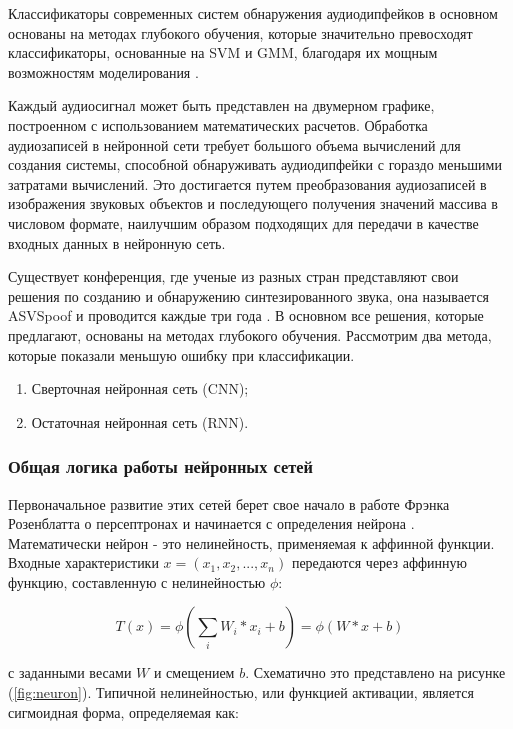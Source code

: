 Классификаторы современных систем обнаружения аудиодипфейков в основном основаны на методах глубокого обучения, которые значительно превосходят классификаторы, основанные на SVM и GMM, благодаря их мощным возможностям моделирования \cite{godoy2015using}.

Каждый аудиосигнал может быть представлен на двумерном графике, построенном с использованием математических расчетов. Обработка аудиозаписей в нейронной сети требует большого объема вычислений для создания системы, способной обнаруживать аудиодипфейки с гораздо меньшими затратами вычислений. Это достигается путем преобразования аудиозаписей в изображения звуковых объектов и последующего получения значений массива в числовом формате, наилучшим образом подходящих для передачи в качестве входных данных в нейронную сеть.

Существует конференция, где ученые из разных стран представляют свои решения по созданию и обнаружению синтезированного звука, она называется ASVSpoof и проводится каждые три года \cite{yamagishi2021asvspoof}. В основном все решения, которые предлагают, основаны на методах глубокого обучения. Рассмотрим два метода, которые показали меньшую ошибку при классификации.
\begin{enumerate}
    \item Сверточная нейронная сеть (CNN);
    \item Остаточная нейронная сеть (RNN).
\end{enumerate}

\subsubsection{Общая логика работы нейронных сетей}

Первоначальное развитие этих сетей берет свое начало в работе Фрэнка Розенблатта о персептронах и начинается с определения нейрона \cite{DOU2023484}. Математически нейрон - это нелинейность, применяемая к аффинной функции. Входные характеристики \(x = (x_1, x_2, . . . , x_n)\) передаются через аффинную функцию, составленную с нелинейностью \(\phi\):

\begin{equation}
    T(x) = \phi\left(\sum_{i} W_{i} \ast x_{i} + b\right) = \phi(W \ast x + b)
\end{equation}

с заданными весами \(W\) и смещением \(b\). Схематично это представлено на рисунке (\ref{fig:neuron}). Типичной нелинейностью, или функцией активации, является сигмоидная форма, определяемая как:

